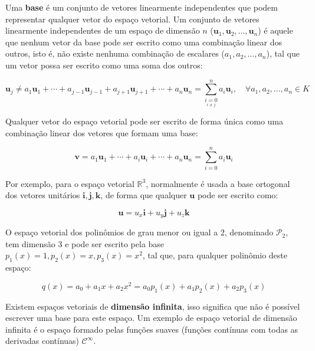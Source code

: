         Uma \textbf{base} é um conjunto de vetores linearmente independentes que podem representar qualquer vetor do espaço vetorial. Um conjunto de vetores linearmente independentes de um espaço de dimensão $n$ ($\mathbf{u}_1, \mathbf{u}_2, \ldots, \mathbf{u}_n$) é aquele que nenhum vetor da base pode ser escrito como uma combinação linear dos outros, isto é, não existe nenhuma combinação de escalares ($a_1, a_2, \ldots, a_n$), tal que um vetor possa ser escrito como uma soma dos outros:

        \begin{equation}
            \mathbf{u}_j \neq a_1 \mathbf{u}_1 + \cdots + a_{j-1} \mathbf{u}_{j-1} + a_{j+1} \mathbf{u}_{j+1} + \cdots + a_n \mathbf{u}_n = \sum\limits_{\underset{i\neq j}{i=0}}^n a_i \mathbf{u}_i , \quad \forall a_1, a_2, \ldots, a_n \in K
        \end{equation}

        Qualquer vetor do espaço vetorial pode ser escrito de forma única como uma combinação linear dos vetores que formam uma base:

        \begin{equation}
            \mathbf{v} = a_1 \mathbf{u}_1 + \cdots + a_{i} \mathbf{u}_{i} + \cdots + a_n \mathbf{u}_n = \sum\limits_{i=0}^n a_i \mathbf{u}_i
        \end{equation}

        Por exemplo, para o espaço vetorial $\mathbb{R}^3$, normalmente é usada a base ortogonal dos vetores unitários $\mathbf{i}, \mathbf{j}, \mathbf{k}$, de forma que qualquer $\mathbf{u}$ pode ser escrito como:

        \begin{equation}
            \mathbf{u} = u_x \mathbf{i} + u_y \mathbf{j} + u_z \mathbf{k}
        \end{equation}

        O espaço vetorial dos polinômios de grau menor ou igual a $2$, denominado $\mathcal{P}_2$, tem dimensão $3$ e pode ser escrito pela base $p_1(x) = 1, p_2(x) = x, p_3(x) = x^2$, tal que, para qualquer polinômio deste espaço:

        \begin{equation}
            q(x) = a_0 + a_1x + a_2 x^2 = a_0 p_1(x) + a_1 p_2(x) + a_2 p_3(x)
        \end{equation}
    
        Existem espaços vetoriais de \textbf{dimensão infinita}, isso significa que não é possível escrever uma base para este espaço. Um exemplo de espaço vetorial de dimensão infinita é o espaço formado pelas funções suaves (funções contínuas com todas as derivadas contínuas) $\mathcal{C}^\infty$.

